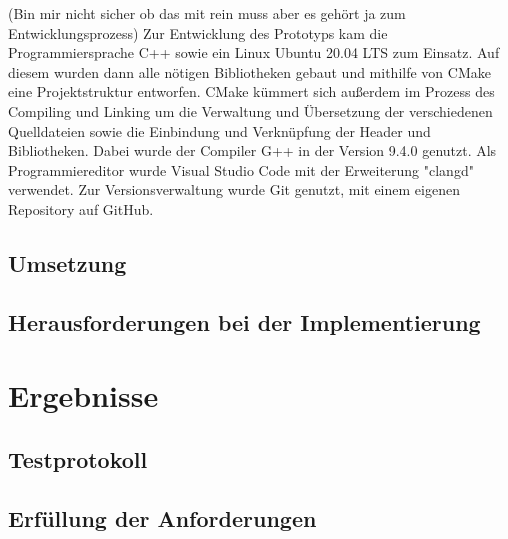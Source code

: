 \documentclass[thesis.tex]{subfiles}
\begin{document}
(Bin mir nicht sicher ob das mit rein muss aber es gehört ja zum Entwicklungsprozess)
Zur Entwicklung des Prototyps kam die Programmiersprache C++ sowie ein Linux Ubuntu 20.04 LTS zum Einsatz.
Auf diesem wurden dann alle nötigen Bibliotheken gebaut und mithilfe von CMake eine Projektstruktur entworfen.
CMake kümmert sich außerdem im Prozess des Compiling und Linking um die Verwaltung und Übersetzung der verschiedenen Quelldateien
sowie die Einbindung und Verknüpfung der Header und Bibliotheken.
Dabei wurde der Compiler G++ in der Version 9.4.0 genutzt.
Als Programmiereditor wurde Visual Studio Code mit der Erweiterung "clangd" verwendet.
Zur Versionsverwaltung wurde Git genutzt, mit einem eigenen Repository auf GitHub.

\subsection{Umsetzung}
\subsection{Herausforderungen bei der Implementierung}
\section{Ergebnisse}
\subsection{Testprotokoll}
\subsection{Erfüllung der Anforderungen}

\subfilebib %
\end{document}
